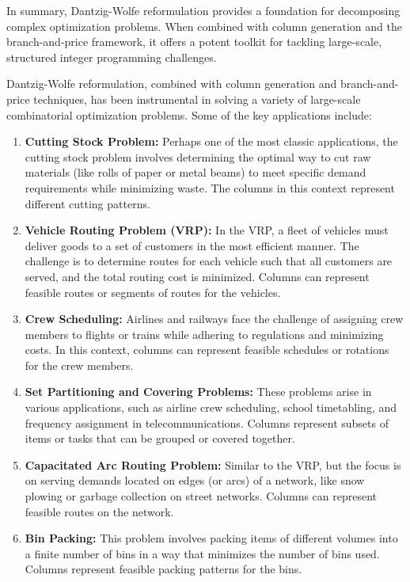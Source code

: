 In summary, Dantzig-Wolfe reformulation provides a foundation for decomposing complex optimization problems. When combined with column generation and the branch-and-price framework, it offers a potent toolkit for tackling large-scale, structured integer programming challenges.

Dantzig-Wolfe reformulation, combined with column generation and branch-and-price techniques, has been instrumental in solving a variety of large-scale combinatorial optimization problems. Some of the key applications include:

\begin{enumerate}
    \item \textbf{Cutting Stock Problem:} Perhaps one of the most classic applications, the cutting stock problem involves determining the optimal way to cut raw materials (like rolls of paper or metal beams) to meet specific demand requirements while minimizing waste. The columns in this context represent different cutting patterns.
    
    \item \textbf{Vehicle Routing Problem (VRP):} In the VRP, a fleet of vehicles must deliver goods to a set of customers in the most efficient manner. The challenge is to determine routes for each vehicle such that all customers are served, and the total routing cost is minimized. Columns can represent feasible routes or segments of routes for the vehicles.
    
    \item \textbf{Crew Scheduling:} Airlines and railways face the challenge of assigning crew members to flights or trains while adhering to regulations and minimizing costs. In this context, columns can represent feasible schedules or rotations for the crew members.
    
    \item \textbf{Set Partitioning and Covering Problems:} These problems arise in various applications, such as airline crew scheduling, school timetabling, and frequency assignment in telecommunications. Columns represent subsets of items or tasks that can be grouped or covered together.
    
    \item \textbf{Capacitated Arc Routing Problem:} Similar to the VRP, but the focus is on serving demands located on edges (or arcs) of a network, like snow plowing or garbage collection on street networks. Columns can represent feasible routes on the network.
    
    \item \textbf{Bin Packing:} This problem involves packing items of different volumes into a finite number of bins in a way that minimizes the number of bins used. Columns represent feasible packing patterns for the bins.
\end{enumerate}

